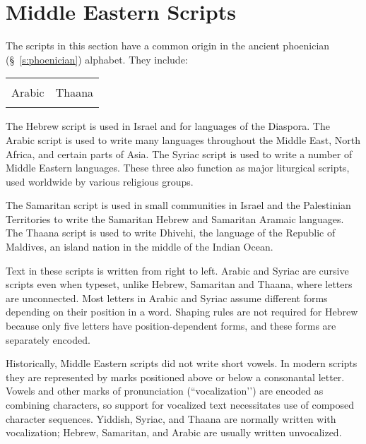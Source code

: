 \chapter{Middle Eastern Scripts}
\label{ch:middleeasternscripts}

The scripts in this section have a common origin in the ancient phoenician (\S~\ref{s:phoenician}) alphabet. They include:

\begin{center}
\begin{tabular}{ll}
\nameref{hebrew} & \nameref{s:samaritan}\\
Arabic & Thaana\\
\nameref{s:syriac} &\\
\end{tabular}
\end{center}

The Hebrew script is used in Israel and for languages of the Diaspora. The Arabic script is
used to write many languages throughout the Middle East, North Africa, and certain parts
of Asia. The Syriac script is used to write a number of Middle Eastern languages. These
three also function as major liturgical scripts, used worldwide by various religious groups.

The Samaritan script is used in small communities in Israel and the Palestinian Territories
to write the Samaritan Hebrew and Samaritan Aramaic languages. The Thaana script is
used to write Dhivehi, the language of the Republic of Maldives, an island nation in the
middle of the Indian Ocean. 

Text in these scripts is written from right to left. Arabic and Syriac are cursive scripts even when typeset, unlike Hebrew, Samaritan  and Thaana, where letters are unconnected. Most letters in Arabic and Syriac assume different forms depending on their position in a word. Shaping rules are not required for Hebrew because only five letters have position-dependent forms, and these forms are separately encoded.

Historically, Middle Eastern  scripts did not write short vowels. In modern scripts they are represented  by marks positioned above or below a consonantal letter. Vowels and other
marks of pronunciation (``vocalization’’) are encoded as combining characters, so support
for vocalized text necessitates use of composed character sequences. Yiddish, Syriac, and
Thaana are normally written with vocalization; Hebrew, Samaritan, and Arabic are usually written unvocalized. 













\endinput










